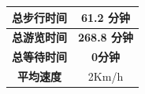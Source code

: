 \documentclass[hyperref,UTF8]{article}
\begin{document}
{\begin{table}[htbp]
\begin{tabular}{|c|c|c|c|c|}
    \hline
    \multicolumn{1}{|p{4.055em}|}{\textbf{总步行时间}} & \multicolumn{4}{c|}{\textbf{61.2 分钟}} \bigstrut\\
    \hline
    \multicolumn{1}{|p{4.055em}|}{\textbf{总游览时间}} & \multicolumn{4}{c|}{\textbf{268.8  分钟}} \bigstrut\\
    \hline
    \multicolumn{1}{|p{4.055em}|}{\textbf{总等待时间}} & \multicolumn{4}{c|}{\textbf{0分钟}} \bigstrut\\
    \hline
    \multicolumn{1}{|c|}{\multirow{2}[2]{*}{\textbf{平均速度}}} & \multicolumn{4}{c|}{\multirow{2}[2]{*}{ 2Km/h}} \bigstrut[t]\\
       & \multicolumn{4}{c|}{} \bigstrut[b]\\
    \hline
    \end{tabular}%
  \label{tab:addlabel+2}%
\end{table}%

}
\end{document}
